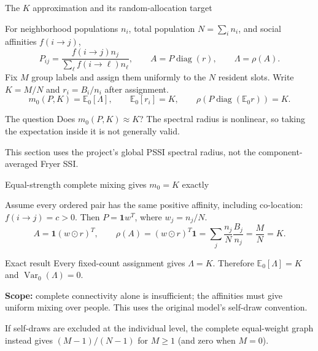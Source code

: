 \begin{frame}{The $K$ approximation and its random-allocation target}
\small

For neighborhood populations $n_i$, total population $N=\sum_i n_i$, and social affinities $f(i\to j)$,
\[
 P_{ij}=\frac{f(i\to j)n_j}{\sum_\ell f(i\to\ell)n_\ell},\qquad
 A=P\operatorname{diag}(r),\qquad \Lambda=\rho(A).
\]
Fix $M$ group labels and assign them uniformly to the $N$ resident slots.
Write $K=M/N$ and $r_i=B_i/n_i$ after assignment.
\[
 m_0(P,K)=\mathbb E_0[\Lambda],\qquad
 \mathbb E_0[r_i]=K,\qquad \rho(P\operatorname{diag}(\mathbb E_0r))=K.
\]
\begin{block}{The question}
Does $m_0(P,K)\approx K$? The spectral radius is nonlinear, so taking the expectation inside it is not generally valid.
\end{block}
This section uses the project's global PSSI spectral radius, not the component-averaged Fryer SSI.

\end{frame}

\begin{frame}{Equal-strength complete mixing gives $m_0=K$ exactly}
\small

Assume every ordered pair has the same positive affinity, including co-location:
$f(i\to j)=c>0$. Then $P=\mathbf1w^T$, where $w_j=n_j/N$.
\[
 A=\mathbf1(w\odot r)^T,\qquad
 \rho(A)=(w\odot r)^T\mathbf1
       =\sum_j\frac{n_j}{N}\frac{B_j}{n_j}
       =\frac MN=K.
\]
\begin{block}{Exact result}
Every fixed-count assignment gives $\Lambda=K$. Therefore
$\mathbb E_0[\Lambda]=K$ and $\operatorname{Var}_0(\Lambda)=0$.
\end{block}
\textbf{Scope:} complete connectivity alone is insufficient; the affinities must give uniform mixing over people. This uses the original model's self-draw convention.
\medskip

\footnotesize If self-draws are excluded at the individual level, the complete equal-weight graph instead gives $(M-1)/(N-1)$ for $M\geq1$ (and zero when $M=0$).

\end{frame}

